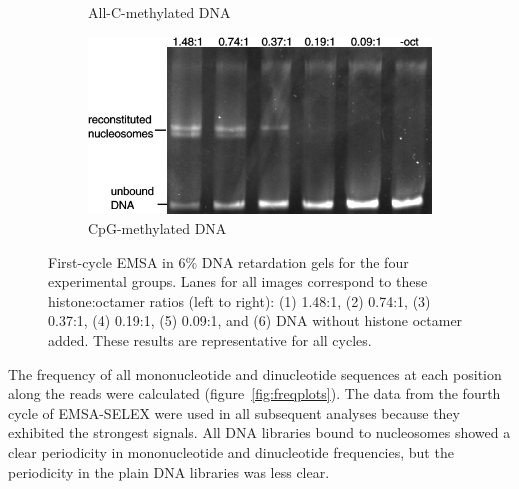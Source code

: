 \documentclass[parskip=full, numbers=noenddot]{scrreprt}
\begin{document}
\begin{figure}[h]
\begin{subfigure}[htpb]{0.4\textwidth}
    \caption{All-C-methylated DNA}
    \label{fig:reconstnuc_c}
  \end{subfigure}
  \begin{subfigure}[htpb]{0.4\textwidth}
    \centering
    \includegraphics[width=\textwidth]{reconstnuc_d}
    \caption{CpG-methylated DNA}
    \label{fig:reconstnuc_d}
  \end{subfigure}
  \caption{First-cycle EMSA in 6\% DNA retardation gels for the four experimental groups.  Lanes for all images correspond to these histone:octamer ratios (left to right): (1) 1.48:1, (2) 0.74:1, (3) 0.37:1, (4) 0.19:1, (5) 0.09:1, and (6) DNA without histone octamer added.  These results are representative for all cycles.}
  \label{fig:reconstnuc}
\end{figure}

The frequency of all mononucleotide and dinucleotide sequences at each position along the reads were calculated (figure~\ref{fig:freqplots}).  The data from the fourth cycle of EMSA-SELEX were used in all subsequent analyses because they exhibited the strongest signals.  All DNA libraries bound to nucleosomes showed a clear periodicity in mononucleotide and dinucleotide frequencies, but the periodicity in the plain DNA libraries was less clear.
\end{document}
